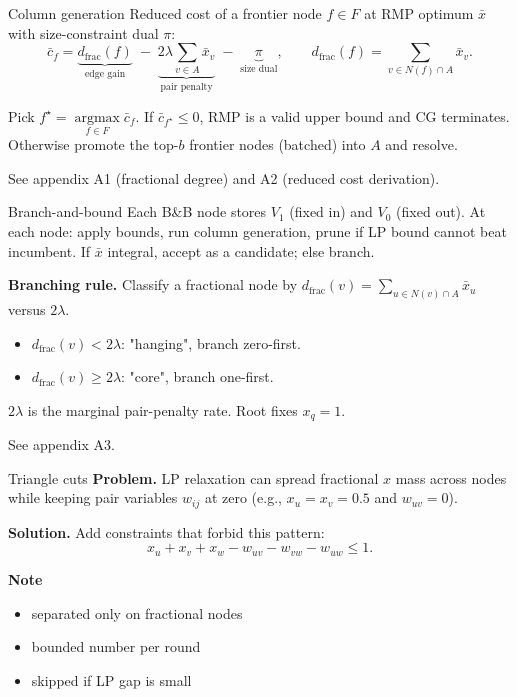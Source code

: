 \documentclass{beamer}
\newcommand{\argmax}{\mathop{\mathrm{argmax}}\limits}
\begin{document}
\begin{frame}{Column generation}
  Reduced cost of a frontier node $f \in F$ at RMP optimum $\bar{x}$ with size-constraint dual $\pi$:
  \[
    \bar{c}_f
    = \underbrace{d_{\mathrm{frac}}(f)}_{\text{edge gain}}
    \;-\; \underbrace{2\lambda \sum_{v \in A} \bar{x}_v}_{\text{pair penalty}}
    \;-\; \underbrace{\pi}_{\text{size dual}},
    \qquad d_{\mathrm{frac}}(f) = \sum_{v \in N(f) \cap A} \bar{x}_v.
  \]

  Pick $f^\star = \argmax_{f \in F} \bar{c}_f$. If $\bar{c}_{f^\star} \le 0$, RMP is a valid upper bound and CG terminates. Otherwise promote the top-$b$ frontier nodes (batched) into $A$ and resolve.

  \vfill

  \footnotesize See appendix A1 (fractional degree) and A2 (reduced cost derivation).
\end{frame}

\begin{frame}{Branch-and-bound}
  Each B\&B node stores $V_1$ (fixed in) and $V_0$ (fixed out). At each node: apply bounds, run column generation, prune if LP bound cannot beat incumbent. If $\bar{x}$ integral, accept as a candidate; else branch.

  \vfill

  \textbf{Branching rule.} Classify a fractional node by $d_{\mathrm{frac}}(v) = \sum_{u \in N(v) \cap A} \bar{x}_u$ versus $2\lambda$.
  \begin{itemize}
    \item $d_{\mathrm{frac}}(v) < 2\lambda$: "hanging", branch zero-first.
    \item $d_{\mathrm{frac}}(v) \ge 2\lambda$: "core", branch one-first.
  \end{itemize}
  $2\lambda$ is the marginal pair-penalty rate. Root fixes $x_q = 1$.

  \vfill

  \footnotesize See appendix A3.
\end{frame}

\begin{frame}{Triangle cuts}
  \textbf{Problem.} LP relaxation can spread fractional $x$ mass across nodes while keeping pair variables $w_{ij}$ at zero (e.g., $x_u = x_v = 0.5$ and $w_{uv} = 0$).

  \vfill

  \textbf{Solution.} Add constraints that forbid this pattern:
  \[
    x_u + x_v + x_w - w_{uv} - w_{vw} - w_{uw} \le 1.
  \]

  \vfill

  \textbf{Note}
  \begin{itemize}
    \item separated only on fractional nodes
    \item bounded number per round
    \item skipped if LP gap is small
  \end{itemize}
\end{frame}
\end{document}
